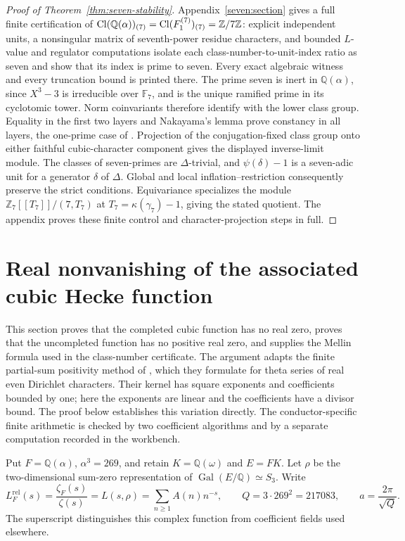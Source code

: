 \documentclass[11pt]{article}
\theoremstyle{remark}\newtheorem{remark}[theorem]{Remark}
\newcommand{\Z}{\mathbb Z}\newcommand{\Q}{\mathbb Q}\newcommand{\F}{\mathbb F}
\begin{document}
\begin{proof}[Proof of Theorem~\ref{thm:seven-stability}]
Appendix~\ref{seven:section} gives a full finite certification of
$\Cl(\Q(\alpha))_{(7)}=\Cl(F_1^{(7)})_{(7)}=\Z/7\Z$:
explicit independent units, a nonsingular matrix of seventh-power residue
characters, and bounded $L$-value and regulator computations isolate each
class-number-to-unit-index ratio as seven and show that its index is prime
to seven. Every exact algebraic witness and every truncation bound is
printed there.
The prime seven is inert in $\Q(\alpha)$, since $X^3-3$ is irreducible over
$\F_7$, and is the unique ramified prime in its cyclotomic tower.
Norm coinvariants therefore identify with the lower class group.
Equality in the first two layers and Nakayama's lemma prove constancy in
all layers, the one-prime case of \citet[Theorem~1(1)]{sevenFukuda1994}.
Projection of the conjugation-fixed class group onto either faithful
cubic-character component gives the displayed inverse-limit module.
The classes of seven-primes are $\Delta$-trivial, and
$\psi(\delta)-1$ is a seven-adic unit for a generator $\delta$ of $\Delta$.
Global and local inflation--restriction consequently preserve the strict
conditions. Equivariance specializes the module
$\Z_7[[T_7]]/(7,T_7)$ at $T_7=\kappa(\gamma_7)-1$, giving the stated quotient.
The appendix proves these finite control and character-projection
steps in full.
\end{proof}

\section{Real nonvanishing of the associated cubic Hecke function}
\label{sec:cubic-real-nonvanishing}
This section proves that the completed cubic function has no real zero, proves that the uncompleted function has no positive real zero, and supplies the Mellin formula used in the class-number certificate.
The argument adapts the finite partial-sum positivity method of \citet[Theorem~4, pp.~646--647]{LouboutinMunsch2013}, which they formulate for theta series of real even Dirichlet characters.
Their kernel has square exponents and coefficients bounded by one; here the exponents are linear and the coefficients have a divisor bound. The proof below establishes this variation directly.
The conductor-specific finite arithmetic is checked by two coefficient algorithms and by a separate computation recorded in the workbench.

Put $F=\mathbb Q(\alpha)$, $\alpha^3=269$, and retain $K=\mathbb Q(\omega)$ and $E=FK$.
Let $\rho$ be the two-dimensional sum-zero representation of $\operatorname{Gal}(E/\mathbb Q)\simeq S_3$.
Write
\[
 L_F^{\mathrm{rel}}(s)=\frac{\zeta_F(s)}{\zeta(s)}=L(s,\rho)
   =\sum_{n\ge1}A(n)n^{-s},\qquad
 Q=3\cdot269^2=217083,\qquad a=\frac{2\pi}{\sqrt Q}.
\]
The superscript distinguishes this complex function from coefficient fields used elsewhere.
\end{document}

